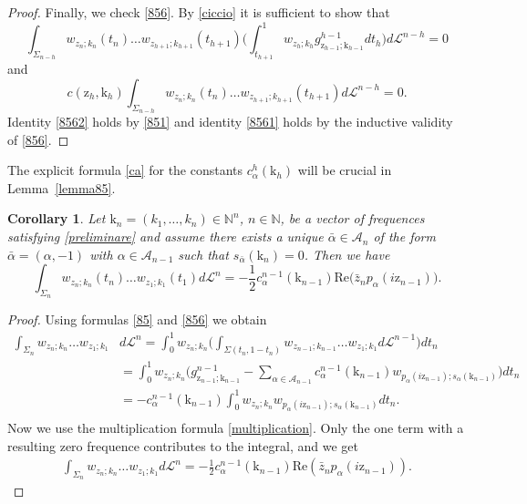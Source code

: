 \documentclass[12pt, reqno]{amsart}
\theoremstyle{plain}
\newtheorem {corollary} [theorem]{Corollary}
\theoremstyle{definition}
\theoremstyle{remark}
\numberwithin{equation}{section}
\newcommand{\N}{\mathbb{N}}
\renewcommand{\L}{\mathcal{L}}
\newcommand{\A}{\mathcal{A}}
\newcommand{\0}{\theta}
\renewcommand{\a}{\alpha}
\renewcommand{\k}{\kappa}
\newcommand{\z}{\zeta}
\newcommand{\1}{{-1}}
\renewcommand{\=}{\coloneqq}
\renewcommand{\.}{\dots}
\newcommand{\mc}{\mathcal}
\newcommand{\be}{\begin{equation}}
\newcommand{\ee}{\end{equation}}
\renewcommand{\A}{\mc A}
\renewcommand{\z}{\mathrm z}
\renewcommand{\k}{\mathrm k}
\renewcommand{\Re}{\mathrm {Re}}
\begin{document}
\begin{proof}
  
  
  Finally, we check  \eqref{856}. By \eqref{ciccio} it is sufficient to show that
  \be\label{8561}
  \int_{\Sigma_{n-h}}w_{z_n;k_n}(t_n) \.w_{z_{h+1};k_{h+1}}(t_{h+1})  \Big( 
   \int_{t_{h+1}}^1 w_{z_h;k_h}g^{h-1}_{\z_{h-1};\k_{h-1}}dt_h  \Big) 
   d\L^{n-h}=0
  \ee
  and 
  \be\label{8562}c(\z_h,\k_h)
  \int_{\Sigma_{n-h}}w_{z_n;k_n}(t_n) \.w_{z_{h+1};k_{h+1}}(t_{h+1})   d\L^{n-h}=0.
  \ee
Identity \eqref{8562} holds by  \eqref{851} and identity \eqref{8561} holds by the inductive validity of  \eqref{856}.

\end{proof}

 The explicit formula \eqref{ca} for the constants $c_\a^{h}(\k_h)$ will be crucial  in Lemma~\ref{lemma85}.

 
 
 
 
 
\begin{corollary}
 \label{bugsbunny2}
 Let $\k_n=(k_1,\dots,k_n) \in \N^n$, $n\in\N$,  be a vector of frequences  satisfying \eqref{preliminare}
 and assume there exists a unique $\bar \a\in\A_n$ of the form $\bar\a=(\a,-1)$ with $\a\in\A_{n-1}$ such that $s_{\bar\a} (\k_n)=0$. Then we have
  \be\label{95}
  \int_{\Sigma_n}w_{z_n;k_n}(t_n) \.w_{z_1;k_1}(t_1) d\L^{n}=-\frac 12 c_\a^{n-1} (\k_{n-1} )  \Re\big( \bar z_n p_\a(i\z_{n-1} )\big)   .
 \ee             \end{corollary}


 \begin{proof}
 Using formulas \eqref{85} and \eqref{856} 
  we obtain
 \[
 \begin{split}
  \int_{\Sigma_n} w_{z_n;k_n} \.w_{z_1;k_1} & d\L^{n} 
  = \int_0^1 w_{z_n;k_n} \Big(  \int_{\Sigma(t_n,1-t_n)}
   w_{z_{n-1};k_{n-1}}
  \.w_{z_1;k_1} d\L^{n-1} \Big) dt_n
  \\
  &
  = \int_0^1 w_{z_n;k_n}\Big(
  g_{\z_{n-1};\k_{n-1} }^{n-1}
  -\sum_{\a\in\A_{n-1} }c_\a^{n-1} (\k_{n-1})  
  w_{p_\a(i\z_{n-1});s_\a(\k_{n-1})} \Big)dt_n
  \\
  &
  =-c_\a^{n-1} (\k_{n-1})    \int_0^1 w_{z_n;k_n}   w_{p_\a(i\z_{n-1});s_\a(\k_{n-1})}  dt_n.
   \\
  \end{split}
 \]
 Now we use the multiplication formula \eqref{multiplication}. Only the one term with a resulting zero frequence contributes to the integral, and we get
 \[
 \begin{split}
  \int_{\Sigma_n}w_{z_n;k_n} \.w_{z_1;k_1} d\L^{n}   =-\frac 12 c_\a^{n-1} (\k_{n-1}) \Re ( \bar z_n p_\a(i\z_{n-1})).
  \end{split}
 \]
 
 \end{proof}
 
\end{document}
